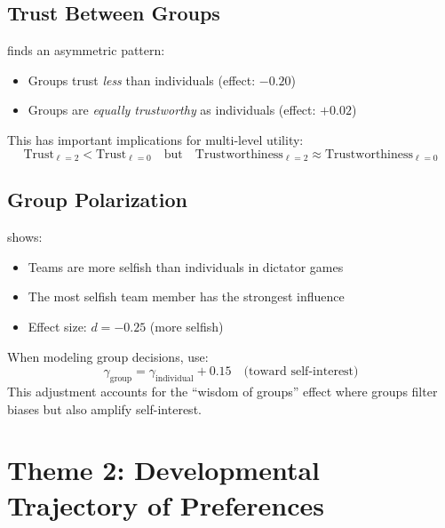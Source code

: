 \subsection{Trust Between Groups}

\citet{kugler2007trust} finds an asymmetric pattern:
\begin{itemize}
\item Groups trust \textit{less} than individuals (effect: $-0.20$)
\item Groups are \textit{equally trustworthy} as individuals (effect: $+0.02$)
\end{itemize}

This has important implications for multi-level utility:
\begin{equation}
\text{Trust}_{\ell=2} < \text{Trust}_{\ell=0} \quad \text{but} \quad \text{Trustworthiness}_{\ell=2} \approx \text{Trustworthiness}_{\ell=0}
\end{equation}

\subsection{Group Polarization}

\citet{luhan2009polarization} shows:
\begin{itemize}
\item Teams are more selfish than individuals in dictator games
\item The most selfish team member has the strongest influence
\item Effect size: $d = -0.25$ (more selfish)
\end{itemize}

\begin{tcolorbox}[colback=yellow!5!white, colframe=yellow!75!black,
    title=Implication for LLMMC]
When modeling group decisions, use:
\begin{equation}
\gamma_{\text{group}} = \gamma_{\text{individual}} + 0.15 \quad \text{(toward self-interest)}
\end{equation}
This adjustment accounts for the ``wisdom of groups'' effect where groups filter biases but also amplify self-interest.
\end{tcolorbox}


\section{Theme 2: Developmental Trajectory of Preferences}
\label{sec:su-developmental}

